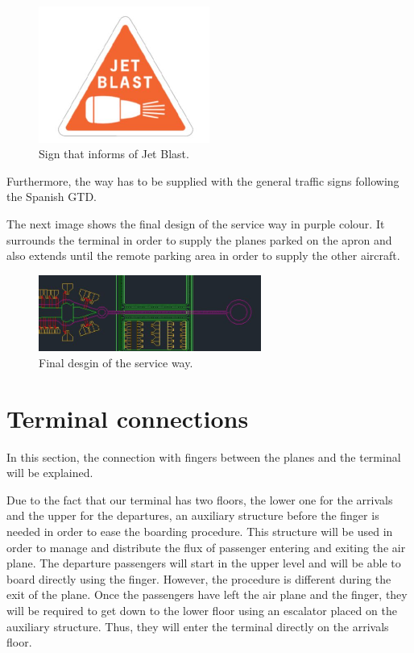  	\begin{figure}[H]
	\centering
	\includegraphics[clip, trim=0cm 0cm 0cm 0cm, width=0.5\textwidth]{./images/serviceway/sign2}
	\caption{Sign that informs of Jet Blast.} %
	\label{} %
	\end{figure} 
	
	
	Furthermore, the way has to be supplied with the general traffic signs following the Spanish GTD. 
	
	The next image shows the final design of the service way in purple colour. It surrounds the terminal in order to supply the planes parked on the apron and also extends until the remote parking area in order to supply the other aircraft.
	
	\begin{figure}[H]
		\centering
		\includegraphics[clip, trim=0cm 0cm 0cm 0cm, angle=90, width=0.65\textwidth]{./images/serviceway/serviceway}
		\caption{Final desgin of the service way.} %
		\label{} %
	\end{figure} 
	
	\section{Terminal connections}
	In this section, the connection with fingers between the planes and the terminal will be explained. 
	
	Due to the fact that our terminal has two floors, the lower one for the arrivals and the upper for the departures, an auxiliary structure before the finger is needed in order to ease the boarding procedure. This structure will be used in order to manage and distribute the flux of passenger entering and exiting the air plane. The departure passengers will start in the upper level and will be able to board directly using the finger. However, the procedure is different during the exit of the plane. Once the passengers have left the air plane and the finger, they will be required to get down to the lower floor using an escalator placed on the auxiliary structure. Thus, they will enter the terminal directly on the arrivals floor.
	
